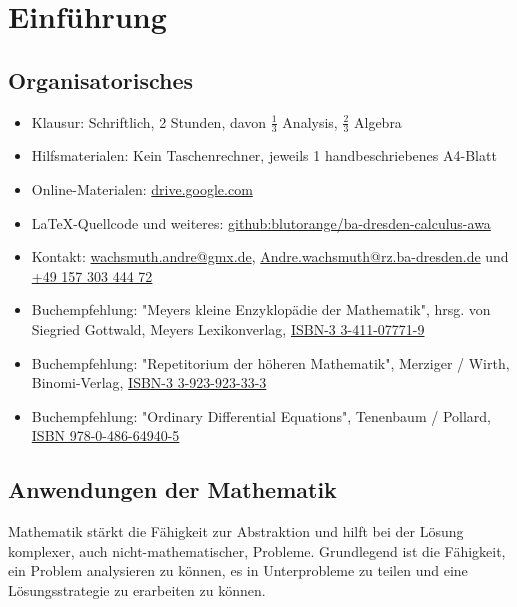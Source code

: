 \chapter{Einführung}

\section{Organisatorisches}

\begin{itemize}
	\item Klausur: Schriftlich, 2 Stunden, davon $\frac{1}{3}$ Analysis, $\frac{2}{3}$ Algebra
	\item Hilfsmaterialen: Kein Taschenrechner, jeweils 1 handbeschriebenes A4-Blatt
	\item Online-Materialen: \href{https://drive.google.com/drive/folders/1CJ0226zg1_bnbt7IopCLwDuK2hkOgHya?usp=sharing}{drive.google.com}
	\item \LaTeX-Quellcode und weiteres: \href{https://github.com/blutorange/ba-dresden-calculus-awa}{github:blutorange/ba-dresden-calculus-awa}
	\item Kontakt: \href{mailto:wachsmuth.andre@gmx.de?subject=BA/Analysis 2020: }{wachsmuth.andre@gmx.de}, \href{mailto:Andre.wachsmuth@rz.ba-dresden.de}{Andre.wachsmuth@rz.ba-dresden.de} und \href{tel:4915730344472}{+49 157 303 444 72}
	\item Buchempfehlung: "Meyers kleine Enzyklopädie der Mathematik", hrsg. von Siegried Gottwald, Meyers Lexikonverlag, \href{https://www.amazon.de/-/en/Siegfried-Gottwald/dp/3411077719}{ISBN-3 3-411-07771-9}
	\item Buchempfehlung: "Repetitorium der höheren Mathematik", Merziger / Wirth, Binomi-Verlag, \href{https://www.amazon.de/-/en/Gerhard-Merziger/dp/3923923333}{ISBN-3 3-923-923-33-3}
    \item Buchempfehlung: "Ordinary Differential Equations", Tenenbaum / Pollard, \href{https://www.lehmanns.de/shop/mathematik-informatik/1860759-9780486649405-ordinary-differential-equations}{ISBN 978-0-486-64940-5}
\end{itemize}

\section{Anwendungen der Mathematik}

Mathematik stärkt die Fähigkeit zur Abstraktion und hilft bei der Lösung komplexer, auch nicht-mathematischer, Probleme. Grundlegend
ist die Fähigkeit, ein Problem analysieren zu können, es in Unterprobleme zu teilen und eine Lösungsstrategie zu erarbeiten zu können.

